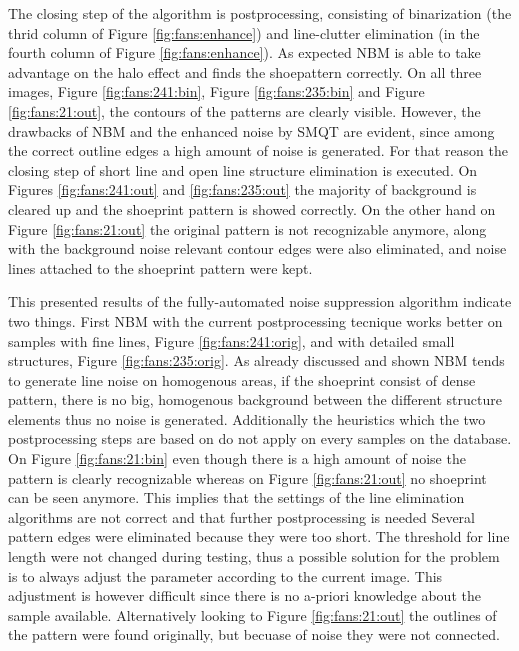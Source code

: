 \documentclass[draft,final]{vutinfth} %
\begin{document}
\par
The closing step of the algorithm is postprocessing, consisting of binarization (the thrid column of Figure \ref{fig:fans:enhance}) and line-clutter elimination (in the fourth column of Figure \ref{fig:fans:enhance}).
As expected NBM is able to take advantage on the halo effect and finds the shoepattern correctly. 
On all three images, Figure \ref{fig:fans:241:bin}, Figure \ref{fig:fans:235:bin} and Figure \ref{fig:fans:21:out}, the contours of the patterns are clearly visible.
However, the drawbacks of NBM and the enhanced noise by SMQT are evident, since among the correct outline edges a high amount of noise is generated.
For that reason the closing step of short line and open line structure elimination is executed.
On Figures \ref{fig:fans:241:out} and \ref{fig:fans:235:out} the majority of background is cleared up and the shoeprint pattern is showed correctly.
On the other hand on Figure \ref{fig:fans:21:out} the original pattern is not recognizable anymore, along with the background noise relevant contour edges were also eliminated, and noise lines attached to the shoeprint pattern were kept.
\par
This presented results of the fully-automated noise suppression algorithm indicate two things.
First NBM with the current postprocessing tecnique works better on samples with fine lines, Figure \ref{fig:fans:241:orig}, and with detailed small structures, Figure \ref{fig:fans:235:orig}.
As already discussed and shown NBM tends to generate line noise on homogenous areas, if the shoeprint consist of dense pattern, there is no big, homogenous background between the different structure elements thus no noise is generated.
Additionally the heuristics which the two postprocessing steps are based on do not apply on every samples on the database.
On Figure  \ref{fig:fans:21:bin} even though there is a high amount of noise the pattern is clearly recognizable whereas on Figure \ref{fig:fans:21:out} no shoeprint can be seen anymore.
This implies that the settings of the line elimination algorithms are not correct and that further postprocessing is needed
Several pattern edges were eliminated because they were too short.
The threshold for line length were not changed during testing, thus a possible solution for the problem is to always adjust the parameter according to the current image.
This adjustment is however difficult since there is no a-priori knowledge about the sample available.
Alternatively looking to Figure  \ref{fig:fans:21:out} the outlines of the pattern were found originally, but becuase of noise they were not connected.
\end{document}
